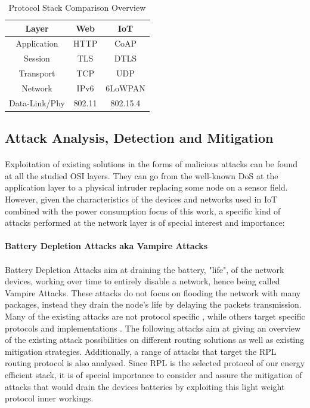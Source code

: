 \begin{table}[h]
	\centering
	\begin{center} \caption{Protocol Stack Comparison Overview } \label{tab:stack}\end{center}
	\begin{tabular}{c|c|c}
		Layer & Web & IoT \\
		\hline
		Application & \ac{HTTP} & \ac{CoAP} \\
		Session & \ac{TLS} & \ac{DTLS} \\
		Transport & \ac{TCP} & \ac{UDP} \\
		Network & IPv6 & 6LoWPAN \\
		Data-Link/Phy & 802.11 & 802.15.4
	\end{tabular}
\end{table}

\subsection{Attack Analysis, Detection and Mitigation}
\paragraph{}
Exploitation of existing solutions in the forms of malicious attacks can be found at all the studied OSI layers. They can go from the well-known \ac{DoS} at the application layer to a physical intruder replacing some node on a sensor field. However, given the characteristics of the devices and networks used in \ac{IoT} combined with the power consumption focus of this work, a specific kind of attacks performed at the network layer is of special interest and importance:

\paragraph{\textbf{Battery Depletion Attacks aka Vampire Attacks}}
\paragraph{}
Battery Depletion Attacks aim at draining the battery, "life", of the network devices, working over time to entirely disable a network, hence being called Vampire Attacks. These attacks do not focus on flooding the network with many packages, instead they drain the node's life by delaying the packets transmission. Many of the existing attacks are not protocol specific \cite{Vasserman2013}, while others target specific protocols and implementations \cite{Pongle2015}. The following attacks aim at giving an overview of the existing attack possibilities on different routing solutions as well as existing mitigation strategies. Additionally, a range of attacks that target the RPL routing protocol is also analysed. Since RPL is the selected protocol of our energy efficient stack, it is of special importance to consider and assure the mitigation of attacks that would drain the devices batteries by exploiting this light weight protocol inner workings.   

